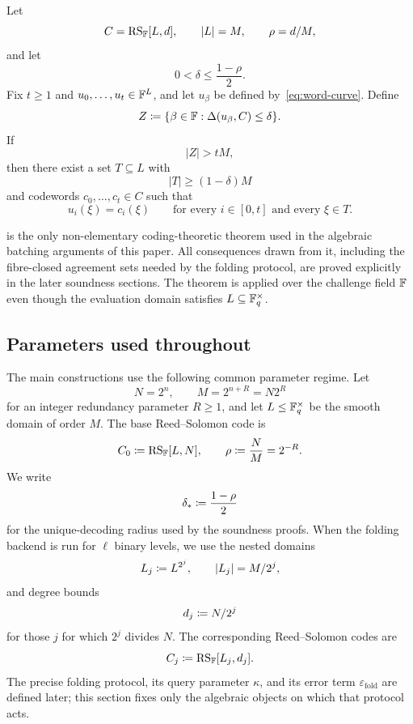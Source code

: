 \begin{theorem}
\label{thm:correlated-agreement}
Let
\[
  C=\operatorname{RS}_{\mathbb{F}}[L,d],
  \qquad |L|=M,
  \qquad \rho=d/M,
\]
and let
\[
  0<\delta\le\frac{1-\rho}{2}.
\]
Fix $t\ge1$ and $u_0,\ldots,u_t\in\mathbb{F}^L$, and let $u_\beta$ be defined by~\eqref{eq:word-curve}.  Define
\[
  Z\coloneqq\{\beta\in\mathbb{F}:\Delta(u_\beta,C)\le\delta\}.
\]
If
\[
  |Z|>tM,
\]
then there exist a set $T\subseteq L$ with
\[
  |T|\ge(1-\delta)M
\]
and codewords $c_0,\ldots,c_t\in C$ such that
\[
  u_i(\xi)=c_i(\xi)
  \qquad
  \text{for every }i\in[0,t]\text{ and every }\xi\in T.
\]
\end{theorem}

\begin{remark}
\label{rem:external-input}
 is the only non-elementary coding-theoretic theorem used in the algebraic batching arguments of this paper.  All consequences drawn from it, including the fibre-closed agreement sets needed by the folding protocol, are proved explicitly in the later soundness sections.  The theorem is applied over the challenge field $\mathbb{F}$ even though the evaluation domain satisfies $L\subseteq\mathbb{F}_q^\times$.
\end{remark}

\subsection{Parameters used throughout}
\label{sec:preliminaries-parameters}

The main constructions use the following common parameter regime.  Let
\[
  N=2^n,
  \qquad
  M=2^{n+R}=N2^R
\]
for an integer redundancy parameter $R\ge1$, and let $L\le\mathbb{F}_q^\times$ be the smooth domain of order $M$.  The base Reed--Solomon code is
\begin{equation}
  C_0\coloneqq\operatorname{RS}_{\mathbb{F}}[L,N],
  \qquad
  \rho\coloneqq\frac NM=2^{-R}.
  \label{eq:base-code}
\end{equation}
We write
\begin{equation}
  \delta_*\coloneqq\frac{1-\rho}{2}
  \label{eq:unique-radius}
\end{equation}
for the unique-decoding radius used by the soundness proofs.  When the folding backend is run for $\ell$ binary levels, we use the nested domains
\[
  L_j\coloneqq L^{2^j},
  \qquad
  |L_j|=M/2^j,
\]
and degree bounds
\[
  d_j\coloneqq N/2^j
\]
for those $j$ for which $2^j$ divides $N$.  The corresponding Reed--Solomon codes are
\[
  C_j\coloneqq\operatorname{RS}_{\mathbb{F}}[L_j,d_j].
\]
The precise folding protocol, its query parameter $\kappa$, and its error term $\varepsilon_{\mathrm{fold}}$ are defined later; this section fixes only the algebraic objects on which that protocol acts.
